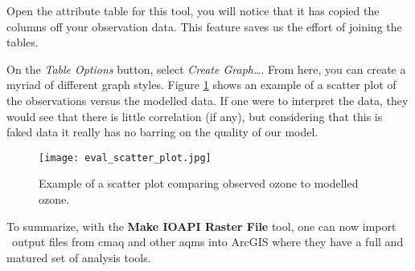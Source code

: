 Open the attribute table for this tool, you will notice that it has
copied the columns off your observation data.  This feature saves us
the effort of joining the tables.

On the \emph{Table Options} button, select \emph{Create Graph\ldots}.
From here, you can create a myriad of different graph styles.  Figure
\ref{scatter} shows an example of a scatter plot of the observations
versus the modelled data.  If one were to interpret the data, they
would see that there is little correlation (if any), but considering
that this is faked data it really has no barring on the quality of our
model.

\begin{figure}
	\centering
	\texttt{[image: eval\_scatter\_plot.jpg]}
	\caption{Example of a scatter plot comparing observed ozone to
modelled ozone.}
	\label{scatter}
\end{figure}

To summarize, with the \textbf{Make IOAPI Raster File} tool, one can
now import \ioapi~output files from \ac{cmaq} and other \acp{aqm} into
ArcGIS where they have a full and matured set of analysis tools.
